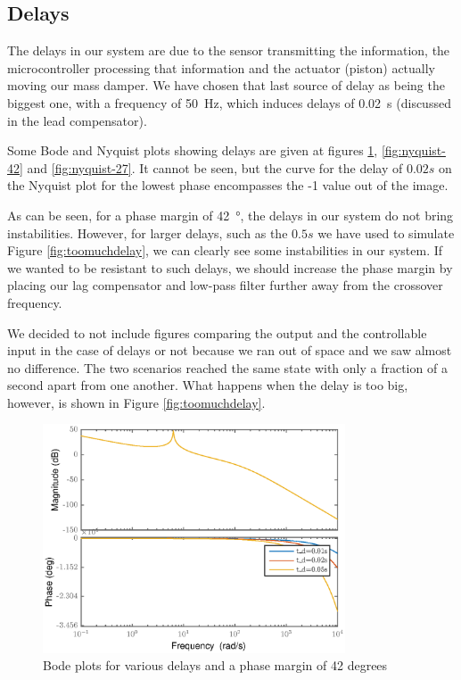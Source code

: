 \subsection{Delays}
The delays in our system are due to the sensor transmitting the information, the microcontroller processing that information and the actuator (piston) actually moving our mass damper. We have chosen that last source of delay as being the biggest one, with a frequency of \SI{50}{\hertz}, which induces delays of \SI{0.02}{\second} (discussed in the lead compensator).\cite{}\par
Some Bode and Nyquist plots showing delays are given at figures \ref{fig:bode-42}, \ref{fig:nyquist-42} and \ref{fig:nyquist-27}. It cannot be seen, but the curve for the delay of $0.02s$ on the Nyquist plot for the lowest phase encompasses the -1 value out of the image.\par
As can be seen, for a phase margin of \SI{42}{\degree}, the delays in our system do not bring instabilities. However, for larger delays, such as the $0.5s$ we have used to simulate Figure \ref{fig:toomuchdelay}, we can clearly see some instabilities in our system. If we wanted to be resistant to such delays, we should increase the phase margin by placing our lag compensator and low-pass filter further away from the crossover frequency.\par
We decided to not include figures comparing the output and the controllable input in the case of delays or not because we ran out of space and we saw almost no difference. The two scenarios reached the same state with only a fraction of a second apart from one another. What happens when the delay is too big, however, is shown in Figure \ref{fig:toomuchdelay}.
\begin{figure}[H]
    \centering
    \includegraphics[width=0.8\textwidth]{resources/eps/4-Val/bode_delays.eps}
    \caption{Bode plots for various delays and a phase margin of 42 degrees}
    \label{fig:bode-42}
\end{figure}
